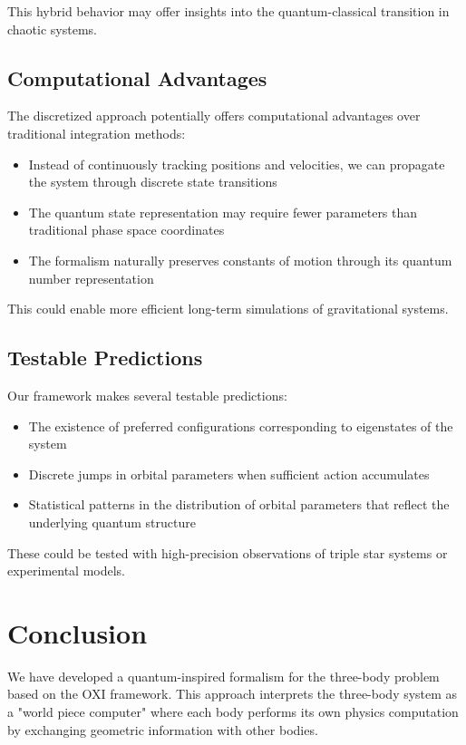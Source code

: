 \documentclass{article}
\begin{document}
This hybrid behavior may offer insights into the quantum-classical transition in chaotic systems.

\subsection{Computational Advantages}

The discretized approach potentially offers computational advantages over traditional integration methods:
\begin{itemize}
\item Instead of continuously tracking positions and velocities, we can propagate the system through discrete state transitions
\item The quantum state representation may require fewer parameters than traditional phase space coordinates
\item The formalism naturally preserves constants of motion through its quantum number representation
\end{itemize}

This could enable more efficient long-term simulations of gravitational systems.

\subsection{Testable Predictions}

Our framework makes several testable predictions:
\begin{itemize}
\item The existence of preferred configurations corresponding to eigenstates of the system
\item Discrete jumps in orbital parameters when sufficient action accumulates
\item Statistical patterns in the distribution of orbital parameters that reflect the underlying quantum structure
\end{itemize}

These could be tested with high-precision observations of triple star systems or experimental models.

\section{Conclusion}

We have developed a quantum-inspired formalism for the three-body problem based on the OXI framework. This approach interprets the three-body system as a "world piece computer" where each body performs its own physics computation by exchanging geometric information with other bodies.
\end{document}

